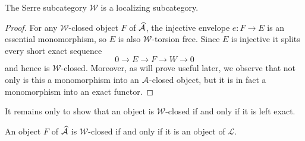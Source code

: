 \documentclass[reqno, 12pt]{amsart}
\begin{document}
\begin{corollary}\label{cor: effaceables are localizing}
  The Serre subcategory $\mathcal{W}$ is a localizing subcategory.
\end{corollary}

\begin{proof}
  For any $\mathcal{W}$-closed object $F$ of $\widehat{\mathcal{A}}$, the injective envelope $e \colon F \to E$ is an essential monomorphism, so $E$ is also $\mathcal{W}$-torsion free.
  Since $E$ is injective it splits every short exact sequence
  $$0 \to E \to F \to W \to 0$$
  and hence is $\mathcal{W}$-closed.
  Moreover, as will prove useful later, we observe that not only is this a monomorphism into an $\mathcal{A}$-closed object, but it is in fact a monomorphism into an exact functor.
\end{proof}

It remains only to show that an object is $\mathcal{W}$-closed if and only if it is left exact.

\begin{proposition}\label{prop: effaceable closed iff lex}
  An object $F$ of $\widehat{\mathcal{A}}$ is $\mathcal{W}$-closed if and only if it is an object of $\mathcal{L}$.
\end{proposition}
\end{document}

